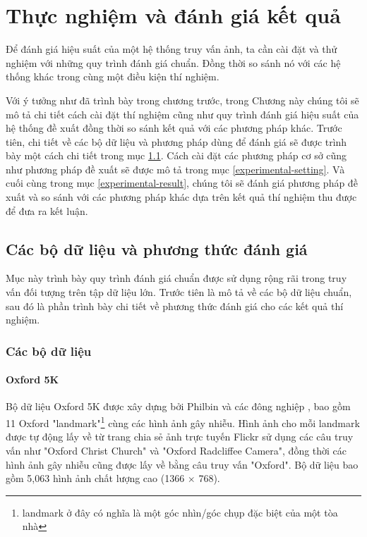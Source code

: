 \chapter{Thực nghiệm và đánh giá kết quả}
\label{chapter:experiment}
\ifpdf
    \graphicspath{{Chapter4/Chapter4Figs/PNG/}{Chapter4/Chapter4Figs/PDF/}{Chapter4/Chapter4Figs/}}
\else
    \graphicspath{{Chapter4/Chapter4Figs/EPS/}{Chapter4/Chapter4Figs/}}
\fi
{}

Để đánh giá hiệu suất của một hệ thống truy vấn ảnh, ta cần cài đặt và thử nghiệm với những quy trình đánh giá chuẩn. Đồng thời so sánh nó với các hệ thống khác trong cùng một điều kiện thí nghiệm.

Với ý tưởng như đã trình bày trong chương trước, trong Chương này chúng tôi sẽ mô tả chi tiết cách cài đặt thí nghiệm cũng như quy trình đánh giá hiệu suất của hệ thống đề xuất đồng thời so sánh kết quả với các phương pháp khác. Trước tiên, chi tiết về các bộ dữ liệu và phương pháp dùng để đánh giá sẽ được trình bày một cách chi tiết trong mục \ref{data-evaluate}. Cách cài đặt các phương pháp cơ sở cũng như phương pháp đề xuất sẽ được mô tả trong mục \ref{experimental-setting}. Và cuối cùng trong mục \ref{experimental-result}, chúng tôi sẽ đánh giá phương pháp đề xuất và so sánh với các phương pháp khác dựa trên kết quả thí nghiệm thu được để đưa ra kết luận.

\section{Các bộ dữ liệu và phương thức đánh giá}
\label{data-evaluate}
Mục này trình bày quy trình đánh giá chuẩn được sử dụng rộng rãi trong truy vấn đối tượng trên tập dữ liệu lớn. Trước tiên là mô tả về các bộ dữ liệu chuẩn, sau đó là phần trình bày chi tiết về phương thức đánh giá cho các kết quả thí nghiệm.

\subsection{Các bộ dữ liệu}

\subsubsection{Oxford 5K}
Bộ dữ liệu Oxford 5K được xây dựng bởi Philbin và các đông nghiệp \cite{philbin2007object}, bao gồm 11 Oxford "landmark"\footnote{landmark ở đây có nghĩa là một góc nhìn/góc chụp đặc biệt của một tòa nhà} cùng các hình ảnh gây nhiễu. Hình ảnh cho mỗi landmark được tự động lấy về từ trang chia sẻ ảnh trực tuyến Flickr sử dụng các câu truy vấn như "Oxford Christ Church" và "Oxford Radcliffee Camera", đồng thời các hình ảnh gây nhiễu cũng được lấy về bằng câu truy vấn "Oxford". Bộ dữ liệu bao gồm 5,063 hình ảnh chất lượng cao (1366 $\times$ 768).

